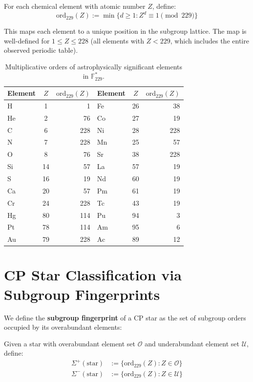 For each chemical element with atomic number $Z$, define:
\begin{equation}
\text{ord}_{229}(Z) := \min\{d \geq 1 : Z^d \equiv 1 \pmod{229}\}
\end{equation}

This maps each element to a unique position in the subgroup lattice. The map is
well-defined for $1 \leq Z \leq 228$ (all elements with $Z < 229$, which includes
the entire observed periodic table).

\begin{table}[h]
\centering
\caption{Multiplicative orders of astrophysically significant elements in $\mathbb{F}_{229}^*$.}
\label{tab:element-orders}
\begin{tabular}{lcrlcr}
\toprule
Element & $Z$ & $\text{ord}_{229}(Z)$ & Element & $Z$ & $\text{ord}_{229}(Z)$ \\
\midrule
H  & 1  & 1   & Fe & 26 & 38  \\
He & 2  & 76  & Co & 27 & 19  \\
C  & 6  & 228 & Ni & 28 & 228 \\
N  & 7  & 228 & Mn & 25 & 57  \\
O  & 8  & 76  & Sr & 38 & 228 \\
Si & 14 & 57  & La & 57 & 19  \\
S  & 16 & 19  & Nd & 60 & 19  \\
Ca & 20 & 57  & Pm & 61 & 19  \\
Cr & 24 & 228 & Tc & 43 & 19  \\
Hg & 80 & 114 & Pu & 94 & 3   \\
Pt & 78 & 114 & Am & 95 & 6   \\
Au & 79 & 228 & Ac & 89 & 12  \\
\bottomrule
\end{tabular}
\end{table}


\section{CP Star Classification via Subgroup Fingerprints}
\label{sec:cp-fingerprint}

We define the \textbf{subgroup fingerprint} of a CP star as the set of
subgroup orders occupied by its overabundant elements:

\begin{definition}
Given a star with overabundant element set $\mathcal{O}$ and underabundant
element set $\mathcal{U}$, define:
\begin{align}
\Sigma^+(\text{star}) &:= \{\text{ord}_{229}(Z) : Z \in \mathcal{O}\} \\
\Sigma^-(\text{star}) &:= \{\text{ord}_{229}(Z) : Z \in \mathcal{U}\}
\end{align}
\end{definition}

